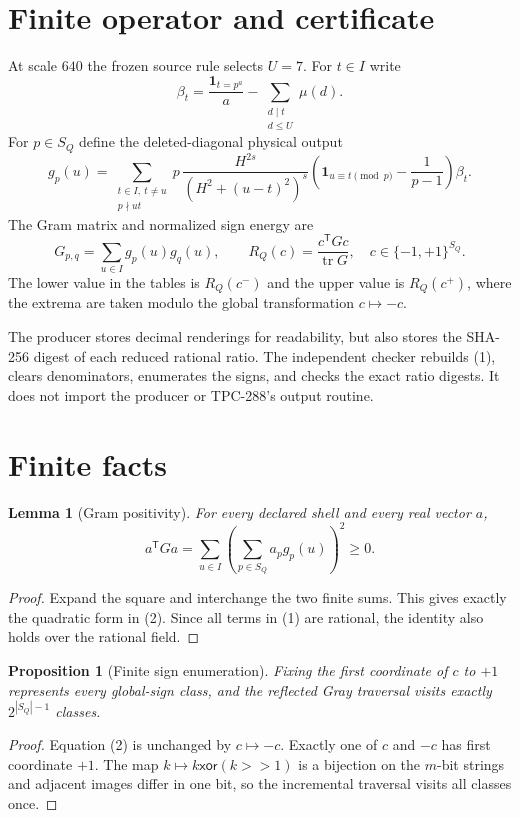 \documentclass[10pt,a4paper]{article}
\newtheorem{proposition}{Proposition}
\newtheorem{lemma}{Lemma}
\begin{document}
\section{Finite operator and certificate}

At scale $640$ the frozen source rule selects $U=7$.  For $t\in I$ write
\[
 \beta_t=\frac{\mathbf 1_{t=p^a}}{a}
 -\sum_{\substack{d\mid t\\d\leq U}}\mu(d).
\]
For $p\in S_Q$ define the deleted-diagonal physical output
\[
 g_p(u)=\sum_{\substack{t\in I,\ t\ne u\\p\nmid ut}}
 p\,\frac{H^{2s}}{(H^2+(u-t)^2)^s}
 \left(\mathbf 1_{u\equiv t\pmod p}-\frac1{p-1}\right)\beta_t.
 \tag{1}
\]
The Gram matrix and normalized sign energy are
\[
 G_{p,q}=\sum_{u\in I}g_p(u)g_q(u),\qquad
 R_Q(c)=\frac{c^\mathsf{T}G c}{\operatorname{tr}G},
 \quad c\in\{-1,+1\}^{S_Q}. \tag{2}
\]
The lower value in the tables is $R_Q(c^-)$ and the upper value is
$R_Q(c^+)$, where the extrema are taken modulo the global transformation
$c\mapsto-c$.

The producer stores decimal renderings for readability, but also stores the
SHA-256 digest of each reduced rational ratio.  The independent checker
rebuilds (1), clears denominators, enumerates the signs, and checks the exact
ratio digests.  It does not import the producer or TPC-288's output routine.

\section{Finite facts}

\begin{lemma}[Gram positivity]
For every declared shell and every real vector $a$,
\[
 a^\mathsf{T}Ga=\sum_{u\in I}\left(\sum_{p\in S_Q}a_pg_p(u)\right)^2\geq0.
\]
\end{lemma}
\begin{proof}
Expand the square and interchange the two finite sums.  This gives exactly
the quadratic form in (2).  Since all terms in (1) are rational, the identity
also holds over the rational field.
\end{proof}

\begin{proposition}[Finite sign enumeration]
Fixing the first coordinate of $c$ to $+1$ represents every global-sign class,
and the reflected Gray traversal visits exactly $2^{|S_Q|-1}$ classes.
\end{proposition}
\begin{proof}
Equation (2) is unchanged by $c\mapsto-c$.  Exactly one of $c$ and $-c$ has
first coordinate $+1$.  The map $k\mapsto k\mathbin{\mathsf{xor}}(k>>1)$ is
a bijection on the $m$-bit strings and adjacent images differ in one bit, so
the incremental traversal visits all classes once.
\end{proof}
\end{document}
